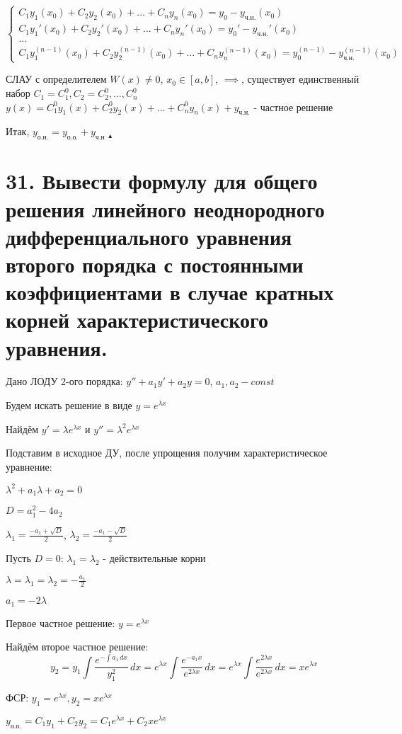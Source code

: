 \documentclass[11pt]{article}
\begin{document}
$$\left\{\begin{array}{l}
C_{1}y_{1}(x_{0}) + C_{2}y_{2}(x_{0}) + \dots + C_{n}y_{n}(x_{0}) = y_{0} - y_{\text{ч.н.}}(x_{0}) \\
C_{1}y_{1}'(x_{0}) + C_{2}y_{2}'(x_{0}) + \dots + C_{n}y_{n}'(x_{0}) = y_{0}' - y_{\text{ч.н.}}'(x_{0}) \\
\dots \\
C_{1}y_{1}^{(n-1)}(x_{0}) + C_{2}y_{2}^{(n-1)}(x_{0}) + \dots + C_{n}y_{n}^{(n-1)}(x_{0}) = y_{0}^{(n-1)} - y_{\text{ч.н.}}^{(n-1)}(x_{0})
\end{array}\right.$$
\par СЛАУ с определителем $W(x) \neq 0$, $x_{0} \in [a, b]$, $\implies$, существует единственный набор $C_{1} = C_{1}^0, C_{2} = C_{2}^0, \dots, C_{n}^0$
$y(x) = C_{1}^0y_{1}(x) + C_{2}^0y_{2}(x) + \dots + C_{n}^0y_{n}(x) + y_{\text{ч.н.}}$ - частное решение
\par Итак, $y_{\text{о.н.}} = y_{\text{о.о.}} + y_{\text{ч.н}}$ $_{\blacktriangle}$

\section*{31. Вывести формулу для общего решения линейного неоднородного дифференциального уравнения второго порядка с постоянными коэффициентами в случае кратных корней характеристического уравнения.}
\par Дано ЛОДУ 2-ого порядка: $y'' + a_{1}y' + a_{2}y = 0$, $a_{1}, a_{2} - const$
\par Будем искать решение в виде $y = e^{\lambda x}$
\par Найдём $y' = \lambda e^{\lambda x}$ и $y'' = \lambda^2 e^{\lambda x}$
\par Подставим в исходное ДУ, после упрощения получим характеристическое уравнение:
\par $\lambda^2 + a_{1} \lambda + a_{2} = 0$
\par $D = a_{1}^2 - 4a_{2}$
\par $\lambda_{1} = \frac{-a_{1} + \sqrt{ D }}{2}$, $\lambda_{2} = \frac{-a_{1} - \sqrt{ D }}{2}$
\par Пусть $D = 0$: $\lambda_{1} = \lambda_{2}$ - действительные корни
\par $\lambda = \lambda_{1} = \lambda_{2} = -\frac{a_{1}}{2}$
\par $a_{1} = -2 \lambda$
\par Первое частное решение: $y = e^{\lambda x}$
\par Найдём второе частное решение:
$$y_{2} = y_{1} \int \frac{e^{-\int a_{1} \, dx}}{y_{1}^2} \, dx = e^{\lambda x} \int \frac{e^{- a_{1} x}}{e^{2\lambda x}} \, dx = e^{\lambda x} \int \frac{e^{2\lambda x}}{e^{2\lambda x}} \, dx = x e^{\lambda x}$$
\par ФСР: $y_{1} = e^{\lambda x}, y_{2} = x e^{\lambda x}$
\par $y_{\text{о.о.}} = C_{1}y_{1} + C_{2}y_{2} = C_{1} e^{\lambda x} + C_{2} x e^{\lambda x}$
\end{document}
